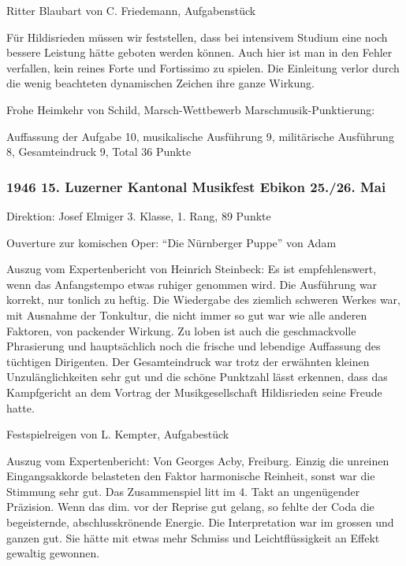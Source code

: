 \begin{history}
    Ritter Blaubart von C. Friedemann, Aufgabenstück

    Für Hildisrieden müssen wir feststellen, dass bei intensivem Studium eine
    noch bessere Leistung hätte geboten werden können. Auch hier ist man in den
    Fehler verfallen, kein reines Forte und Fortissimo zu spielen. Die
    Einleitung verlor durch die wenig beachteten dynamischen Zeichen ihre ganze
    Wirkung.

    Frohe Heimkehr von Schild, Marsch-Wettbewerb Marschmusik-Punktierung:

    Auffassung der Aufgabe 10, musikalische Ausführung 9, militärische
    Ausführung 8, Gesamteindruck 9, Total 36 Punkte

    \subsubsection*{1946 15. Luzerner Kantonal Musikfest Ebikon 25./26. Mai}

    Direktion: Josef Elmiger 3. Klasse, 1. Rang, 89 Punkte

    Ouverture zur komischen Oper: \enquote{Die Nürnberger Puppe} von Adam

    Auszug vom Expertenbericht von Heinrich Steinbeck: Es ist empfehlenswert,
    wenn das Anfangstempo etwas ruhiger genommen wird. Die Ausführung war
    korrekt, nur tonlich zu heftig. Die Wiedergabe des ziemlich schweren Werkes
    war, mit Ausnahme der Tonkultur, die nicht immer so gut war wie alle anderen
    Faktoren, von packender Wirkung. Zu loben ist auch die geschmackvolle
    Phrasierung und hauptsächlich noch die frische und lebendige Auffassung des
    tüchtigen Dirigenten. Der Gesamteindruck war trotz der erwähnten kleinen
    Unzulänglichkeiten sehr gut und die schöne Punktzahl lässt erkennen, dass
    das Kampfgericht an dem Vortrag der Musikgesellschaft Hildisrieden seine
    Freude hatte.

    Festspielreigen von L. Kempter, Aufgabestück

    Auszug vom Expertenbericht: Von Georges Acby, Freiburg. Einzig die unreinen
    Eingangsakkorde belasteten den Faktor harmonische Reinheit, sonst war die
    Stimmung sehr gut. Das Zusammenspiel litt im 4. Takt an ungenügender
    Präzision. Wenn das dim. vor der Reprise gut gelang, so fehlte der Coda die
    begeisternde, abschlusskrönende Energie. Die Interpretation war im grossen
    und ganzen gut. Sie hätte mit etwas mehr Schmiss und Leichtflüssigkeit an
    Effekt gewaltig gewonnen.


\end{history}
